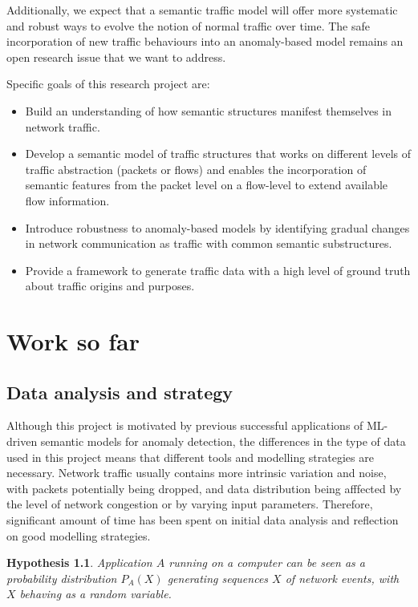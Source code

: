 \documentclass[a4paper,12pt,twoside]{report}
\newtheorem{hypothesis}{Hypothesis}
\begin{document}
Additionally, we expect that a semantic traffic model will offer more systematic and robust ways to evolve the notion of normal traffic over time. The safe incorporation of new traffic behaviours into an anomaly-based model remains an open research issue that we want to address.

Specific goals of this research project are:
\begin{itemize}
\item Build an understanding of how semantic structures manifest themselves in network traffic.
\item Develop a semantic model of traffic structures that works on different levels of traffic abstraction (packets or flows) and enables the incorporation of semantic features from the packet level on a flow-level to extend available flow information.
\item Introduce robustness to anomaly-based models by identifying gradual changes in network communication as traffic with common semantic substructures.
\item Provide a framework to generate traffic data with a high level of ground truth about traffic origins and purposes.
\end{itemize}



\chapter{Work so far}\label{Sofar}



\section{Data analysis and strategy}

Although this project is motivated by previous successful applications of ML-driven semantic models for anomaly detection, the differences in the type of data used in this project means that different tools and modelling strategies are necessary. Network traffic usually contains more intrinsic variation and noise, with packets potentially being dropped, and data distribution being afffected by the level of network congestion or by varying input parameters. Therefore, significant amount of time has been spent on initial data analysis and reflection on good modelling strategies. 


\begin{hypothesis}\label{Ass1}
Application $A$ running on a computer can be seen as a probability distribution $P_A(X)$ generating sequences $X$ of network events, with $X$ behaving as a random variable.
\end{hypothesis}
\end{document}
